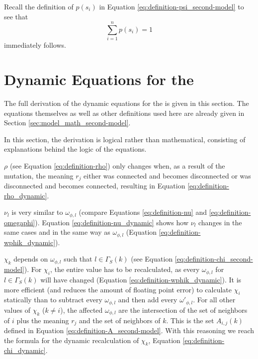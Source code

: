 Recall the definition of $p(s_i)$ in Equation \eqref{eq:definition-psi_second-model} to see that
\begin{equation*}
  \sum_{i=1}^n p(s_i) = 1
\end{equation*}
immediately follows.

\section{Dynamic Equations for the \secondmodel{}}
\label{sec:app_formulae_dynamic-equations_second-model}

The full derivation of the dynamic equations for the \secondmodel{} is given in this section.
The equations themselves as well as other definitions used here are already given in Section \ref{sec:model_math_second-model}.

In this section, the derivation is logical rather than mathematical, consisting of explanations behind the logic of the equations.

$\rho$ (see Equation \eqref{eq:definition-rho}) only changes when, as a result of the mutation, the meaning $r_j$ either was connected and becomes disconnected or was disconnected and becomes connected, resulting in Equation \eqref{eq:definition-rho_dynamic}.

$\nu_l$ is very similar to $\omega_{\phi,l}$ (compare Equations \eqref{eq:definition-nu} and \eqref{eq:definition-omegaphi}).
Equation \eqref{eq:definition-nu_dynamic} shows how $\nu_l$ changes in the same cases and in the same way as $\omega_{\phi,l}$ (Equation \eqref{eq:definition-wphik_dynamic}).

$\chi_k$ depends on  $\omega_{\phi,l}$ such that $l \in \Gamma_S(k)$ (see Equation \eqref{eq:definition-chi_second-model}).
For $\chi_i$, the entire value has to be recalculated, as every $\omega_{\phi,l}$ for $l \in \Gamma_S(k)$ will have changed (Equation \eqref{eq:definition-wphik_dynamic}).
It is more efficient (and reduces the amount of floating point error) to calculate $\chi_i$ statically than to subtract every $\omega_{\phi,l}$ and then add every $\omega'_{\phi,l}$.
For all other values of $\chi_k$ ($k \neq i$), the affected $\omega_{\phi,l}$ are the intersection of the set of neighbors of $i$ plus the meaning $r_j$ and the set of neighbors of $k$. This is the set $A_{i,j}(k)$ defined in Equation \eqref{eq:definition-A_second-model}. With this reasoning we reach the formula for the dynamic recalculation of $\chi_k$, Equation \eqref{eq:definition-chi_dynamic}.

